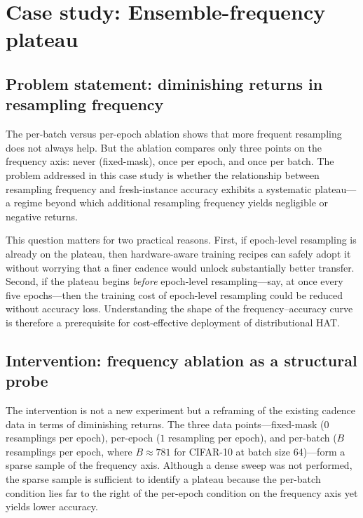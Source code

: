 \section{Case study: Ensemble-frequency plateau}
\label{sec:case-frequency-plateau}

\subsection{Problem statement: diminishing returns in resampling frequency}

The per-batch versus per-epoch ablation shows that more frequent resampling does not always help. But the ablation compares only three points on the frequency axis: never (fixed-mask), once per epoch, and once per batch. The problem addressed in this case study is whether the relationship between resampling frequency and fresh-instance accuracy exhibits a systematic plateau---a regime beyond which additional resampling frequency yields negligible or negative returns.

This question matters for two practical reasons. First, if epoch-level resampling is already on the plateau, then hardware-aware training recipes can safely adopt it without worrying that a finer cadence would unlock substantially better transfer. Second, if the plateau begins \emph{before} epoch-level resampling---say, at once every five epochs---then the training cost of epoch-level resampling could be reduced without accuracy loss. Understanding the shape of the frequency--accuracy curve is therefore a prerequisite for cost-effective deployment of distributional HAT.

\subsection{Intervention: frequency ablation as a structural probe}

The intervention is not a new experiment but a reframing of the existing cadence data in terms of diminishing returns. The three data points---fixed-mask ($0$ resamplings per epoch), per-epoch ($1$ resampling per epoch), and per-batch ($B$ resamplings per epoch, where $B\approx781$ for CIFAR-10 at batch size 64)---form a sparse sample of the frequency axis. Although a dense sweep was not performed, the sparse sample is sufficient to identify a plateau because the per-batch condition lies far to the right of the per-epoch condition on the frequency axis yet yields lower accuracy.

